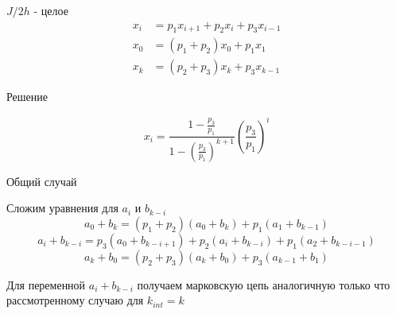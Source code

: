 \documentclass{beamer}
\begin{document}
\begin{frame}{$J/2h$ - целое}
\begin{align*}
		x_i &= p_1 x_{i+1} + p_2 x_i + p_3 x_{i-1}\\
		x_0 &= (p_1 + p_2) x_0 + p_1 x_1\\
		x_k &= (p_2+p_3) x_k + p_3 x_{k-1}
\end{align*}\vspace{-.5cm}
\begin{block}{Решение}
	
	\begin{equation*}
	x_i = \frac{1-\frac{p_3}{p_1}}{1-\left(\frac{p_3}{p_1}\right)^{k+1}} \left(\frac{p_3}{p_1}\right)^i
	\end{equation*}
\end{block}
\end{frame}


\begin{frame}{Общий случай}
	\begin{block}{Сложим уравнения для $a_i$ и $b_{k-i}$}
		\vspace{-1mm}
		\begin{equation*}
		 a_0+b_{k} = (p_1 + p_2) (a_0 +b_k)  + p_1 (a_1 + b_{k-1})
		\end{equation*}
		\begin{equation*}
		a_i + b _{k-i} = p_3 (a_0 + b_{k-i+1}) + p_2 (a_i + b_{k-i}) + p_1 (a_2 + b_{k-i-1})
		\end{equation*}
		\begin{equation*}
		a_k + b_0 = (p_2 + p_3) (a_k + b_0) +p_3(a_{k-1}+b_1)
		\end{equation*}
	\end{block}
	Для переменной $a_i + b_{k-i}$ получаем марковскую цепь аналогичную только что рассмотренному случаю для $k_{int}= k$
\end{frame}
\end{document}
